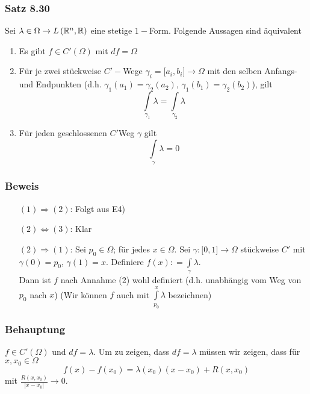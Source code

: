 \subsubsection*{Satz 8.30}
Sei $\lambda\in\Omega\to L\left( \mathbb{R}^n,\mathbb{R}\right)$ eine stetige $1-$Form. Folgende Aussagen sind äquivalent
\begin{enumerate}
\item Es gibt $f\in C'\left( \Omega\right)$ mit $df=\Omega$
\item Für je zwei stückweise $C'-$Wege $\gamma_i=\lbrack a_i,b_i\rbrack\to\Omega$ mit den selben Anfangs- und Endpunkten (d.h. $\gamma_1\left( a_1\right)=\gamma_2\left(a_2\right)$, $\gamma_1\left( b_1\right)=\gamma_2\left(b_2\right)$), gilt \[\int\limits_{{\gamma _1}} \lambda   = \int\limits_{{\gamma _2}} \lambda  \]
\item Für jeden geschlossenen $C'$Weg $\gamma$ gilt \[\int\limits_\gamma  \lambda   = 0\]
\end{enumerate}

\subsubsection*{Beweis}
\begin{enumerate}[align=left]
\item[$(1)\Rightarrow (2)$:] Folgt aus E4)
\item[$(2)\Leftrightarrow (3)$:] Klar
\item[$(2)\Rightarrow (1)$:] Sei $p_0\in\Omega$; für jedes $x\in\Omega$. Sei $\gamma:\lbrack 0,1\rbrack\to\Omega$ stückweise $C'$ mit $\gamma(0)=p_0$, $\gamma(1)=x$. Definiere $f(x): = \int\limits_\gamma  \lambda $.\\

Dann ist $f$ nach Annahme (2) wohl definiert (d.h. unabhängig vom Weg von $p_0$ nach $x$) (Wir können $f$ auch mit $\int\limits_{{p_0}}^x \lambda  $ bezeichnen)
\end{enumerate}

\subsubsection*{Behauptung}
$f\in C'\left( \Omega\right)$ und $df=\lambda$. Um zu zeigen, dass $df=\lambda$ müssen wir zeigen, dass für $x,x_0\in\Omega$
\[f\left(x\right)-f\left(x_0\right)=\lambda\left(x_0\right)\left( x-x_0\right)+R\left( x,x_0\right)\] mit $\frac{R\left( x,x_0\right)}{\left| x-x_0\right|}\to 0$.\\

